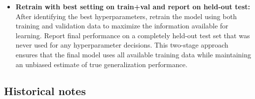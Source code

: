 \begin{itemize}
    \item \textbf{Retrain with best setting on train+val and report on held-out test:} After identifying the best hyperparameters, retrain the model using both training and validation data to maximize the information available for learning. Report final performance on a completely held-out test set that was never used for any hyperparameter decisions. This two-stage approach ensures that the final model uses all available training data while maintaining an unbiased estimate of true generalization performance.
\end{itemize}




\subsection{Historical notes}

